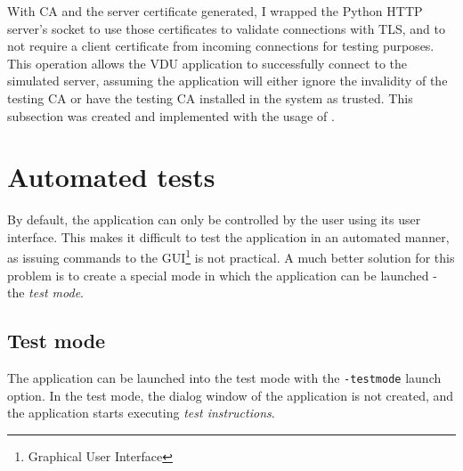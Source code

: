 With CA and the server certificate generated, I wrapped the Python HTTP server's socket to use those certificates to validate connections with TLS, and to not require a client certificate from incoming connections for testing purposes. This operation allows the VDU application to successfully connect to the simulated server, assuming the application will either ignore the invalidity of the testing CA or have the testing CA installed in the system as trusted.
This subsection was created and implemented with the usage of \cite{SSLCertTut}.

\section{Automated tests}
By default, the application can only be controlled by the user using its user interface. This makes it difficult to test the application in an automated manner, as issuing commands to the GUI\footnote{Graphical User Interface} is not practical. A much better solution for this problem is to create a special mode in which the application can be launched - the \textit{test mode}.

\subsection{Test mode}
The application can be launched into the test mode with the \lstinline{-testmode} launch option. In the test mode, the dialog window of the application is not created, and the application starts executing \textit{test instructions}. 

